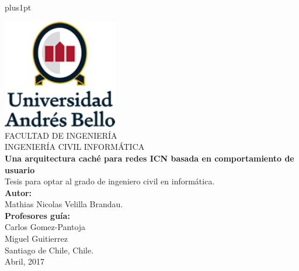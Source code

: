 \documentclass[12pt]{ociamthesis}  %
\begin{document}
\baselineskip=18pt plus1pt


\setcounter{secnumdepth}{3}
\setcounter{tocdepth}{2}


\begin{titlepage}
	\begin{center}
		\includegraphics[width=5cm]{logo2.png}\\
		\vspace{1cm}
		FACULTAD DE INGENIERÍA\\
		INGENIERÍA CIVIL INFORMÁTICA\\
		\vspace{1cm}
		\LARGE{\textbf{Una arquitectura caché para redes ICN basada en comportamiento de usuario} \\}
		\vspace{1cm}
		\small{Tesis para optar al grado de ingeniero civil en informática.}\\
		\vspace{2cm}
		\textbf{Autor:} \\
		Mathias Nicolas Velilla Brandau.\\
		\vspace{1cm}
		\textbf{Profesores guía:} \\
		Carlos Gomez-Pantoja\\
		Miguel Guitierrez\\
		\vspace{1cm}
		Santiago de Chile, Chile.\\
		\vspace{1cm}
		Abril, 2017
	\end{center}
\end{titlepage}
\end{document}
